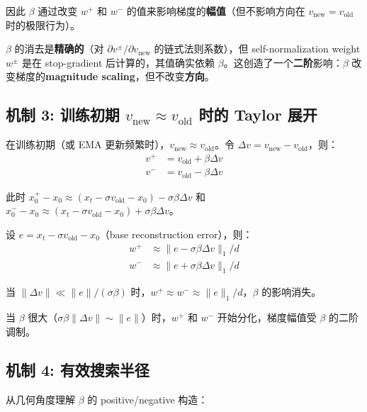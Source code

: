\documentclass[11pt,a4paper]{article}
\theoremstyle{definition}
\begin{document}
因此 $\beta$ 通过改变 $w^+$ 和 $w^-$ 的值来影响梯度的\textbf{幅值}（但不影响方向在 $v_{\text{new}} = v_{\text{old}}$ 时的极限行为）。

\begin{tcolorbox}[title=关键洞察]
$\beta$ 的消去是\textbf{精确的}（对 $\partial v^{\pm}/\partial v_{\text{new}}$ 的链式法则系数），但 self-normalization weight $w^{\pm}$ 是在 stop-gradient 后计算的，其值确实依赖 $\beta$。这创造了一个\textbf{二阶}影响：$\beta$ 改变梯度的\textbf{magnitude scaling}，但不改变\textbf{方向}。
\end{tcolorbox}

\subsection{机制 3: 训练初期 $v_{\text{new}} \approx v_{\text{old}}$ 时的 Taylor 展开}

在训练初期（或 EMA 更新频繁时），$v_{\text{new}} \approx v_{\text{old}}$。令 $\Delta v = v_{\text{new}} - v_{\text{old}}$，则：
\begin{align}
v^+ &= v_{\text{old}} + \beta \Delta v \\
v^- &= v_{\text{old}} - \beta \Delta v
\end{align}

此时 $x_0^+ - x_0 \approx (x_t - \sigma v_{\text{old}} - x_0) - \sigma\beta\Delta v$ 和 $x_0^- - x_0 \approx (x_t - \sigma v_{\text{old}} - x_0) + \sigma\beta\Delta v$。

设 $e = x_t - \sigma v_{\text{old}} - x_0$（base reconstruction error），则：
\begin{align}
w^+ &\approx \|e - \sigma\beta\Delta v\|_1/d \\
w^- &\approx \|e + \sigma\beta\Delta v\|_1/d
\end{align}

当 $\|\Delta v\| \ll \|e\|/(\sigma\beta)$ 时，$w^+ \approx w^- \approx \|e\|_1/d$，$\beta$ 的影响消失。

当 $\beta$ 很大（$\sigma\beta\|\Delta v\| \sim \|e\|$）时，$w^+$ 和 $w^-$ 开始分化，梯度幅值受 $\beta$ 的二阶调制。

\subsection{机制 4: 有效搜索半径}

从几何角度理解 $\beta$ 的 positive/negative 构造：

\begin{center}
\end{center}
\end{document}
